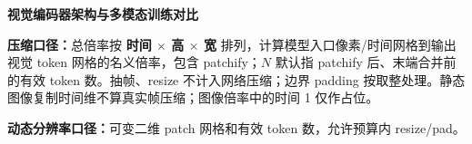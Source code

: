 

{\sffamily\bfseries\color{notesblue}\fontsize{23}{28}\selectfont 视觉编码器架构与多模态训练对比\par}
\vspace{1mm}{\color{notesblue}\rule{\linewidth}{0.8pt}}\par\vspace{1mm}
{\small {\bfseries 压缩口径：}总倍率按 {\bfseries 时间 \(\times\) 高 \(\times\) 宽} 排列，计算模型入口像素/\allowbreak{}时间网格到输出视觉 token 网格的名义倍率，包含 patchify；\(N\) 默认指 patchify 后、末端合并前的有效 token 数。抽帧、resize 不计入网络压缩；边界 padding 按取整处理。静态图像复制时间维不算真实帧压缩；图像倍率中的时间 1 仅作占位。}\par\vspace{2pt}
{\small {\bfseries 动态分辨率口径：}可变二维 patch 网格和有效 token 数，允许预算内 resize/\allowbreak{}pad。}\par\vspace{2pt}
\begingroup
\fontsize{9.5pt}{12pt}\selectfont
\setlength{\tabcolsep}{5pt}
\renewcommand{\arraystretch}{1.02}
\setlength{\extrarowheight}{2pt}
\setlength{\LTpre}{5pt}
\setlength{\LTpost}{6pt}
\setlength{\parskip}{0pt}
\setlength{\emergencystretch}{2em}
